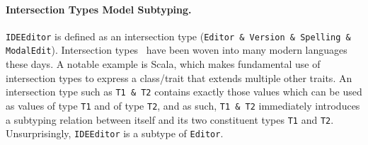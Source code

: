 \paragraph{Intersection Types Model Subtyping.}
\lstinline{IDEEditor} is defined as an intersection type (\lstinline{Editor & Version & Spelling & ModalEdit}).
Intersection types~\cite{coppo1981functional,pottinger1980type} have been woven
into many modern languages these days. A notable example is Scala, which makes
fundamental use of intersection types to express a class/trait that extends
multiple other traits. An intersection type such as \lstinline{T1 & T2} contains
exactly those values which can be used as values of type \lstinline{T1} and of
type \lstinline{T2}, and as such, \lstinline{T1 & T2} immediately introduces a
subtyping relation between itself and its two constituent types \lstinline{T1}
and \lstinline{T2}. Unsurprisingly, \lstinline{IDEEditor} is a subtype of
\lstinline{Editor}.





\begin{comment}
\paragraph{Mutually dependent traits} When two traits are composed, any two
methods in those two traits can refer to each other via the self-reference. We
say these two traits are \emph{mutually dependent}. The next example, though a
bit contrived, illustrates this point.

\noindent By utilizing trait requirements, the \lstinline{isEven} and
\lstinline{isOdd} methods can refer to each other in two different traits.
\end{comment}


